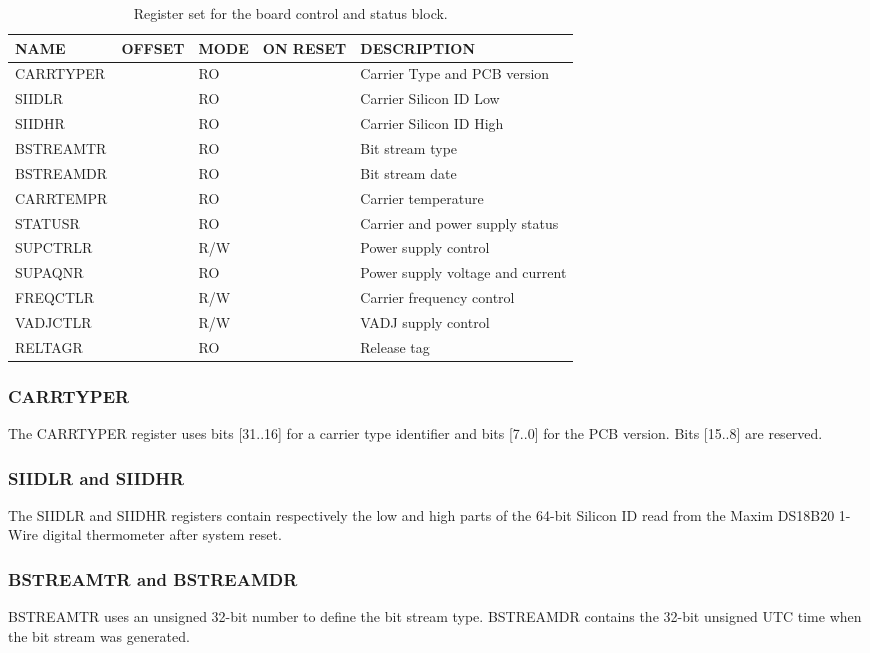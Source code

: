 \documentclass{article}
\begin{document}
\begin{table}[htbp]
  \centering
  \begin{tabularx}{\textwidth}{|l|r|l|l|X|}
    \hline
    \textbf{NAME} & \textbf{OFFSET} & \textbf{MODE} & \textbf{ON RESET} & \textbf{DESCRIPTION} \\
    \hline
    \hline
    CARRTYPER & & RO & & Carrier Type and PCB version\\
    \hline
    SIIDLR & & RO & & Carrier Silicon ID Low \\
    \hline
    SIIDHR & & RO & & Carrier Silicon ID High \\
    \hline
    BSTREAMTR & & RO & & Bit stream type \\
    \hline
    BSTREAMDR & & RO & & Bit stream date \\
    \hline
    CARRTEMPR & & RO & & Carrier temperature \\
    \hline
    STATUSR & & RO & & Carrier and power supply status \\
    \hline
    SUPCTRLR & & R/W & & Power supply control \\
    \hline
    SUPAQNR & & RO & & Power supply voltage and current \\
    \hline
    FREQCTLR & & R/W & & Carrier frequency control \\
    \hline
    VADJCTLR & & R/W & & VADJ supply control \\
    \hline
    RELTAGR & & RO & & Release tag \\
    \hline
  \end{tabularx}
  \caption{Register set for the board control and status block.}
  \label{tab:stat_control}
\end{table}

\subsubsection{CARRTYPER}
The CARRTYPER register uses bits [31..16] for a carrier type identifier and bits [7..0] for the PCB version. Bits [15..8] are reserved. 

\subsubsection{SIIDLR and SIIDHR}
The SIIDLR and SIIDHR registers contain respectively the low and high parts of the 64-bit Silicon ID read from the Maxim DS18B20 1-Wire digital thermometer after system reset. 

\subsubsection{BSTREAMTR and BSTREAMDR}
BSTREAMTR uses an unsigned 32-bit number to define the bit stream type. BSTREAMDR contains the 32-bit unsigned UTC time when the bit stream was generated. 
\end{document}
